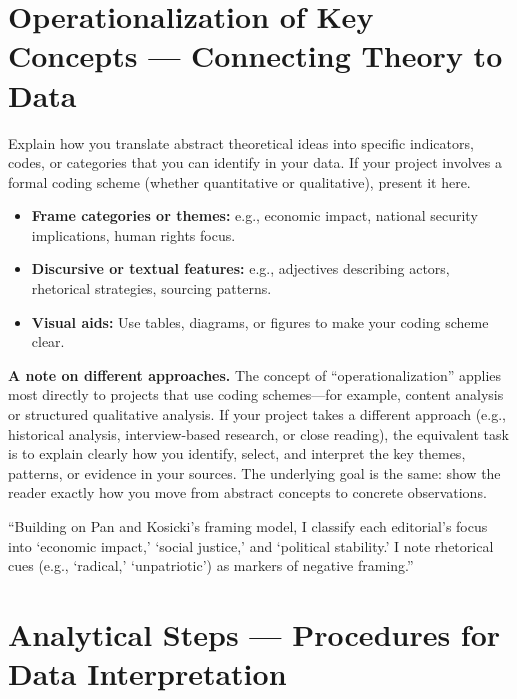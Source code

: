 \documentclass[11pt,a4paper]{article}
\begin{document}
\section{Operationalization of Key Concepts --- Connecting Theory to Data}

Explain how you translate abstract theoretical ideas into specific indicators, codes, or categories that you can identify in your data. If your project involves a formal coding scheme (whether quantitative or qualitative), present it here.

\begin{itemize}[nosep]
  \item \textbf{Frame categories or themes:} e.g., economic impact, national security implications, human rights focus.
  \item \textbf{Discursive or textual features:} e.g., adjectives describing actors, rhetorical strategies, sourcing patterns.
  \item \textbf{Visual aids:} Use tables, diagrams, or figures to make your coding scheme clear.
\end{itemize}

\medskip

\noindent\textbf{A note on different approaches.} The concept of ``operationalization'' applies most directly to projects that use coding schemes---for example, content analysis or structured qualitative analysis. If your project takes a different approach (e.g., historical analysis, interview-based research, or close reading), the equivalent task is to explain clearly how you identify, select, and interpret the key themes, patterns, or evidence in your sources. The underlying goal is the same: show the reader exactly how you move from abstract concepts to concrete observations.

\begin{examplebox}
``Building on Pan and Kosicki's framing model, I classify each editorial's focus into `economic impact,' `social justice,' and `political stability.' I note rhetorical cues (e.g., `radical,' `unpatriotic') as markers of negative framing.''
\end{examplebox}

\section{Analytical Steps --- Procedures for Data Interpretation}
\end{document}
